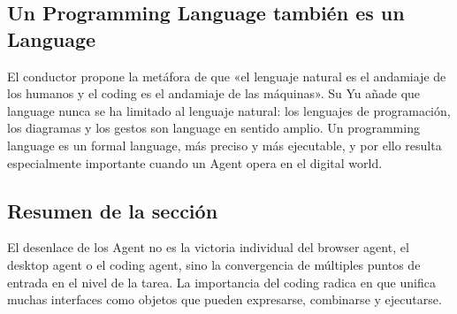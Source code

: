 \subsection{Un Programming Language también es un Language}

El conductor propone la metáfora de que «el lenguaje natural es el andamiaje de los humanos y el coding es el andamiaje de las máquinas». Su Yu añade que language nunca se ha limitado al lenguaje natural: los lenguajes de programación, los diagramas y los gestos son language en sentido amplio. Un programming language es un formal language, más preciso y más ejecutable, y por ello resulta especialmente importante cuando un Agent opera en el digital world.

\subsection{Resumen de la sección}

El desenlace de los Agent no es la victoria individual del browser agent, el desktop agent o el coding agent, sino la convergencia de múltiples puntos de entrada en el nivel de la tarea. La importancia del coding radica en que unifica muchas interfaces como objetos que pueden expresarse, combinarse y ejecutarse.
